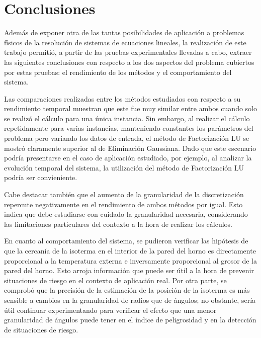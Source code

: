 \section{Conclusiones}

  Además de exponer otra de las tantas posibilidades de aplicación a problemas físicos de la resolución de sistemas de ecuaciones lineales, la realización de este trabajo permitió, a partir de las pruebas experimentales llevadas a cabo, extraer las siguientes conclusiones con respecto a los dos aspectos del problema cubiertos por estas pruebas: el rendimiento de los métodos y el comportamiento del sistema.

  Las comparaciones realizadas entre los métodos estudiados con respecto a su rendimiento temporal muestran que este fue muy similar entre ambos cuando solo se realizó el cálculo para una única instancia. Sin embargo, al realizar el cálculo repetidamente para varias instancias, manteniendo constantes los parámetros del problema pero variando los datos de entrada, el método de Factorización LU se mostró claramente superior al de Eliminación Gaussiana. Dado que este escenario podría presentarse en el caso de aplicación estudiado, por ejemplo, al analizar la evolución temporal del sistema, la utilización del método de Factorización LU podría ser convieniente.

  Cabe destacar también que el aumento de la granularidad de la discretización repercute negativamente en el rendimiento de ambos métodos por igual. Esto indica que debe estudiarse con cuidado la granularidad necesaria, considerando las limitaciones particulares del contexto a la hora de realizar los cálculos.

  En cuanto al comportamiento del sistema, se pudieron verificar las hipótesis de que la cercanía de la isoterma en el interior de la pared del horno es directamente proporcional a la temperatura externa e inversamente proporcional al grosor de la pared del horno. Esto arroja información que puede ser útil a la hora de prevenir situaciones de riesgo en el contexto de aplicación real. Por otra parte, se comprobó que la precisión de la estimación de la posición de la isoterma es más sensible a cambios en la granularidad de radios que de ángulos; no obstante, sería útil continuar experimentando para verificar el efecto que una menor granularidad de ángulos puede tener en el índice de peligrosidad y en la detección de situaciones de riesgo.
